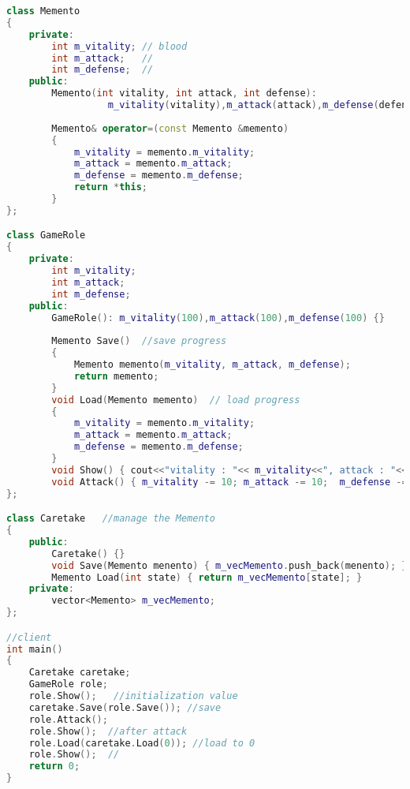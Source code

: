 \documentclass{book}
\begin{document}
\begin{lstlisting}[caption={Memento Pattern example 2}, language=C++]
class Memento    
{  
    private:  
        int m_vitality; // blood 
        int m_attack;   //  
        int m_defense;  //  
    public:  
        Memento(int vitality, int attack, int defense):   
                  m_vitality(vitality),m_attack(attack),m_defense(defense){}  
    
        Memento& operator=(const Memento &memento)   
        {  
            m_vitality = memento.m_vitality;  
            m_attack = memento.m_attack;  
            m_defense = memento.m_defense;  
            return *this;  
        }  
};  

class GameRole    
{  
    private:  
        int m_vitality;  
        int m_attack;  
        int m_defense;  
    public:  
        GameRole(): m_vitality(100),m_attack(100),m_defense(100) {}  
    
        Memento Save()  //save progress
        {   
            Memento memento(m_vitality, m_attack, m_defense);  
            return memento;  
        }  
        void Load(Memento memento)  // load progress
        {  
            m_vitality = memento.m_vitality;  
            m_attack = memento.m_attack;   
            m_defense = memento.m_defense;  
        }  
        void Show() { cout<<"vitality : "<< m_vitality<<", attack : "<< m_attack<<", defense : "<< m_defense<<endl; }  
        void Attack() { m_vitality -= 10; m_attack -= 10;  m_defense -= 10; }  
};  

class Caretake   //manage the Memento 
{  
    public:  
        Caretake() {}  
        void Save(Memento menento) { m_vecMemento.push_back(menento); }  
        Memento Load(int state) { return m_vecMemento[state]; }  
    private:  
        vector<Memento> m_vecMemento;  
};  

//client  
int main()  
{     
    Caretake caretake;  
    GameRole role;   
    role.Show();   //initialization value
    caretake.Save(role.Save()); //save  
    role.Attack();     
    role.Show();  //after attack  
    role.Load(caretake.Load(0)); //load to 0
    role.Show();  //  
    return 0;  
}  
\end{lstlisting}
\end{document}
